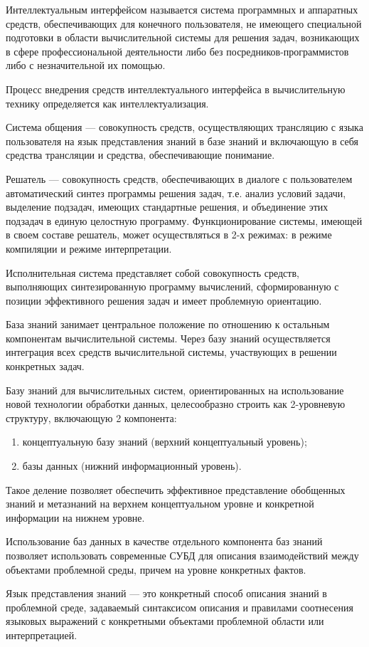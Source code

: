 \documentclass[a4paper,12pt]{report}
\begin{document}
	Интеллектуальным интерфейсом называется система программных и аппаратных
	средств, обеспечивающих для конечного пользователя, не имеющего специальной
	подготовки в области вычислительной системы для решения задач, возникающих в
	сфере профессиональной деятельности либо без посредников-программистов либо с
	незначительной их помощью. \par
	Процесс внедрения средств интеллектуального интерфейса в вычислительную
	технику определяется как интеллектуализация. \par
	Система общения --- совокупность средств, осуществляющих трансляцию с языка
	пользователя на язык представления знаний в базе знаний и включающую
	в себя средства трансляции и средства, обеспечивающие понимание. \par
	Решатель --- совокупность средств, обеспечивающих в диалоге с пользователем
	автоматический синтез программы решения задач, т.е. анализ условий задачи,
	выделение подзадач, имеющих стандартные решения, и объединение этих подзадач
	в единую целостную программу. Функционирование системы, имеющей в своем
	составе решатель, может осуществляться в 2-х режимах: в режиме компиляции
	и режиме интерпретации. \par
	Исполнительная система представляет собой совокупность средств,
	выполняющих синтезированную программу вычислений, сформированную с позиции
	эффективного решения задач и имеет проблемную ориентацию. \par
	База знаний занимает центральное положение по отношению к остальным
	компонентам вычислительной системы. Через базу знаний осуществляется
	интеграция всех средств вычислительной системы, участвующих в решении
	конкретных задач. \par
	Базу знаний для вычислительных систем, ориентированных на использование
	новой технологии обработки данных, целесообразно строить как 2-уровневую
	структуру, включающую 2 компонента:
	\begin{enumerate}
		\item концептуальную базу знаний (верхний концептуальный уровень);
		\item базы данных (нижний информационный уровень).
	\end{enumerate}

	Такое деление позволяет обеспечить эффективное представление обобщенных
	знаний и метазнаний на верхнем концептуальном уровне и конкретной информации
	на нижнем уровне. \par
	Использование баз данных в качестве отдельного компонента баз знаний
	позволяет использовать современные СУБД для описания взаимодействий между
	объектами проблемной среды, причем на уровне конкретных фактов. \par
	Язык представления знаний — это конкретный способ описания знаний в
	проблемной среде, задаваемый синтаксисом описания и правилами соотнесения
	языковых выражений с конкретными объектами проблемной области
	или интерпретацией.
\end{document}
